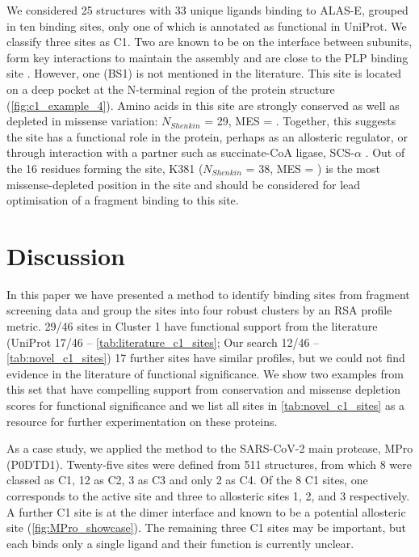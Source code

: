 We considered 25 structures with 33 unique ligands binding to ALAS-E, grouped in ten binding sites, only one of which is annotated as functional in UniProt. We classify three sites as C1. Two are known to be on the interface between subunits, form key interactions to maintain the assembly and are close to the PLP binding site \cite{BAILEY_2020_AMINOLEVULINATE}. However, one (BS1) is not mentioned in the literature. This site is located on a deep pocket at the N-terminal region of the protein structure (\autoref{fig:c1_example_4}). Amino acids in this site are strongly conserved as well as depleted in missense variation: $N_{Shenkin}$ = 29, MES = . Together, this suggests the site has a functional role in the protein, perhaps as an allosteric regulator, or through interaction with a partner such as succinate-CoA ligase, SCS-$\alpha$ \cite{FURUYAMA_2000_SIDEROBLASTIC}. Out of the 16 residues forming the site, K381 ($N_{Shenkin}$ = 38, MES = ) is the most missense-depleted position in the site and should be considered for lead optimisation of a fragment binding to this site.

\section{Discussion}

In this paper we have presented a method to identify binding sites from fragment screening data and group the sites into four robust clusters by an RSA profile metric. 29/46 sites in Cluster 1 have functional support from the literature (UniProt 17/46 -- \autoref{tab:literature_c1_sites}; Our search 12/46 -- \autoref{tab:novel_c1_sites}) 17 further sites have similar profiles, but we could not find evidence in the literature of functional significance. We show two examples from this set that have compelling support from conservation and missense depletion scores for functional significance and we list all sites in \autoref{tab:novel_c1_sites} as a resource for further experimentation on these proteins.

As a case study, we applied the method to the SARS-CoV-2 main protease, MPro (P0DTD1). Twenty-five sites were defined from 511 structures, from which 8 were classed as C1, 12 as C2, 3 as C3 and only 2 as C4. Of the 8 C1 sites, one corresponds to the active site and three to allosteric sites 1, 2, and 3 \cite{DASGUPTA_2022_ALLOSTERIC} respectively. A further C1 site  is at the dimer interface and known to be a potential allosteric site \cite{DOUANGAMATH_2020_SARSCOV2} (\autoref{fig:MPro_showcase}). The remaining three C1 sites may be important, but each binds only a single ligand and their function is currently unclear.

